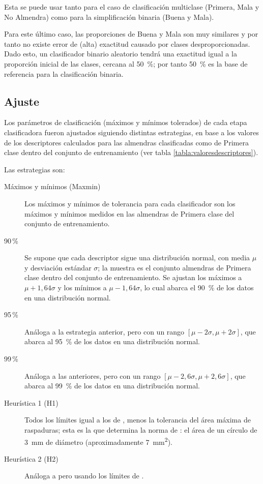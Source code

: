 Esta se puede usar tanto para el caso de clasificación multiclase (Primera, Mala y No Almendra) como para la simplificación binaria (Buena y Mala).

Para este último caso, las proporciones de Buena y Mala son muy similares y por tanto no existe error de (alta) exactitud causado por clases desproporcionadas. Dado esto, un clasificador binario aleatorio tendrá una exactitud igual a la proporción inicial de las clases, cercana al \SI{50}{\percent}; por tanto \SI{50}{\percent} es la base de referencia para la clasificación binaria.




\subsection{Ajuste}
Los parámetros de clasificación (máximos y mínimos tolerados) de cada etapa clasificadora fueron ajustados siguiendo distintas estrategias, en base a los valores de los descriptores calculados para las almendras clasificadas como de Primera clase dentro del conjunto de entrenamiento (ver tabla \ref{tabla:valoresdescriptores}).

Las estrategias son:

\begin{description}
\item [Máximos y mínimos (Maxmin)] Los máximos y mínimos de tolerancia para cada clasificador son los máximos y mínimos medidos en las almendras de Primera clase del conjunto de entrenamiento.
\item [90\,\%] Se supone que cada descriptor sigue una distribución normal, con media $ \mu $ y desviación estándar $ \sigma $; la muestra es el conjunto almendras de Primera clase dentro del conjunto de entrenamiento. Se ajustan los máximos a $ \mu + 1,64 \sigma $ y los mínimos a $ \mu - 1,64\sigma $, lo cual abarca el \SI{90}{\percent} de los datos en una distribución normal.
\item [95\,\%] Análoga a la estrategia anterior, pero con un rango $ \left[ \mu - 2\sigma, \mu + 2\sigma \right] $, que abarca al \SI{95}{\percent} de los datos en una distribución normal.
\item [99\,\%] Análoga a las anteriores, pero con un rango $ \left[ \mu - 2,6\sigma, \mu + 2,6\sigma \right] $, que abarca al \SI{99}{\percent} de los datos en una distribución normal.
\item [Heurística 1 (H1)] Todos los límites igual a los de \textbf{}, menos la tolerancia del área máxima de raspaduras; esta es la que determina la norma de : el área de un círculo de \SI{3}{\mm} de diámetro (aproximadamente \SI{7}{\mm\squared}).
\item [Heurística 2 (H2)] Análoga a \textbf{} pero usando los límites de \textbf{}.
\end{description}

